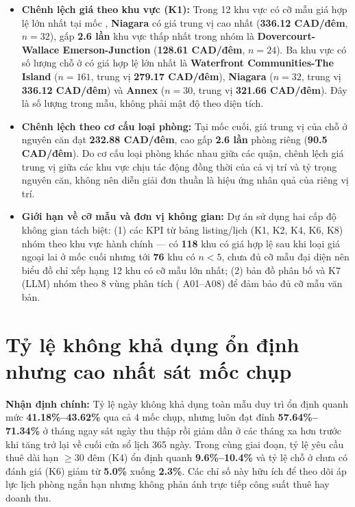 \begin{itemize}
  \item \textbf{Chênh lệch giá theo khu vực (K1):} Trong 12 khu vực có cỡ mẫu giá hợp lệ lớn nhất tại mốc , \textbf{Niagara} có giá trung vị cao nhất (\textbf{336.12 CAD/đêm}, $n = 32$), gấp \textbf{2.6 lần} khu vực thấp nhất trong nhóm là \textbf{Dovercourt-Wallace Emerson-Junction} (\textbf{128.61 CAD/đêm}, $n = 24$). Ba khu vực có số lượng chỗ ở có giá hợp lệ lớn nhất là \textbf{Waterfront Communities-The Island} ($n = 161$, trung vị \textbf{279.17 CAD/đêm}), \textbf{Niagara} ($n = 32$, trung vị \textbf{336.12 CAD/đêm}) và \textbf{Annex} ($n = 30$, trung vị \textbf{321.66 CAD/đêm}). Đây là số lượng trong mẫu, không phải mật độ theo diện tích.
  \item \textbf{Chênh lệch theo cơ cấu loại phòng:} Tại mốc cuối, giá trung vị của chỗ ở nguyên căn đạt \textbf{232.88 CAD/đêm}, cao gấp \textbf{2.6 lần} phòng riêng (\textbf{90.5 CAD/đêm}). Do cơ cấu loại phòng khác nhau giữa các quận, chênh lệch giá trung vị giữa các khu vực chịu tác động đồng thời của cả vị trí và tỷ trọng nguyên căn, không nên diễn giải đơn thuần là hiệu ứng nhân quả của riêng vị trí.
  \item \textbf{Giới hạn về cỡ mẫu và đơn vị không gian:} Dự án sử dụng hai cấp độ không gian tách biệt: (1) các KPI từ bảng listing/lịch (K1, K2, K4, K6, K8) nhóm theo khu vực hành chính  --- có \textbf{118} khu có giá hợp lệ sau khi loại giá ngoại lai ở mốc cuối nhưng tới \textbf{76} khu có $n < 5$, chưa đủ cỡ mẫu đại diện nên biểu đồ chỉ xếp hạng 12 khu có cỡ mẫu lớn nhất; (2) bản đồ phân bố và K7 (LLM) nhóm theo 8 vùng phân tích ( A01--A08) để đảm bảo đủ cỡ mẫu văn bản.
\end{itemize}



\FloatBarrier
\section{Tỷ lệ không khả dụng ổn định nhưng cao nhất sát mốc chụp}

\textbf{Nhận định chính:} Tỷ lệ ngày không khả dụng toàn mẫu duy trì ổn định quanh mức \textbf{41.18\%--43.62\%} qua cả 4 mốc chụp, nhưng luôn đạt đỉnh \textbf{57.64\%--71.34\%} ở tháng ngay sát ngày thu thập rồi giảm dần ở các tháng xa hơn trước khi tăng trở lại về cuối cửa sổ lịch 365 ngày. Trong cùng giai đoạn, tỷ lệ yêu cầu thuê dài hạn $\ge 30$ đêm (K4) ổn định quanh \textbf{9.6\%--10.4\%} và tỷ lệ chỗ ở chưa có đánh giá (K6) giảm từ \textbf{5.0\%} xuống \textbf{2.3\%}. Các chỉ số này hữu ích để theo dõi áp lực lịch phòng ngắn hạn nhưng không phản ánh trực tiếp công suất thuê hay doanh thu.

